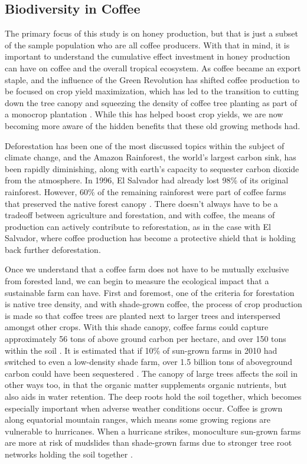 \documentclass[../main.tex]{subfiles}
\begin{document}
\subsection{Biodiversity in Coffee}

The primary focus of this study is on honey production, but that is just a subset of the sample population who are all coffee producers. With that in mind, it is important to understand the cumulative effect investment in honey production can have on coffee and the overall tropical ecosystem. As coffee became an export staple, and the influence of the Green Revolution has shifted coffee production to be focused on crop yield maximization, which has led to the transition to cutting down the tree canopy and squeezing the density of coffee tree planting as part of a monocrop plantation \parencite{hernandez-aguilera_economics_2019}. While this has helped boost crop yields, we are now becoming more aware of the hidden benefits that these old growing methods had.

Deforestation has been one of the most discussed topics within the subject of climate change, and the Amazon Rainforest, the world’s largest carbon sink, has been rapidly diminishing, along with earth’s capacity to sequester carbon dioxide from the atmosphere. In 1996, El Salvador had already lost 98\% of its original rainforest. However, 60\% of the remaining rainforest were part of coffee farms that preserved the native forest canopy \parencite{messer_can_2000}. There doesn’t always have to be a tradeoff between agriculture and forestation, and with coffee, the means of production can actively contribute to reforestation, as in the case with El Salvador, where coffee production has become a protective shield that is holding back further deforestation.

Once we understand that a coffee farm does not have to be mutually exclusive from forested land, we can begin to measure the ecological impact that a sustainable farm can have. First and foremost, one of the criteria for forestation is native tree density, and with shade-grown coffee, the process of crop production is made so that coffee trees are planted next to larger trees and interspersed amongst other crops. With this shade canopy, coffee farms could capture approximately 56 tons of above ground carbon per hectare, and over 150 tons within the soil \parencite{soto-pinto_carbon_2010}. It is estimated that if 10\% of sun-grown farms in 2010 had switched to even a low-density shade farm, over 1.5 billion tons of aboveground carbon could have been sequestered \parencite{soto-pinto_carbon_2010}. The canopy of large trees affects the soil in other ways too, in that the organic matter supplements organic nutrients, but also aids in water retention. The deep roots hold the soil together, which becomes especially important when adverse weather conditions occur. Coffee is grown along equatorial mountain ranges, which means some growing regions are vulnerable to hurricanes. When a hurricane strikes, monoculture sun-grown farms are more at risk of mudslides than shade-grown farms due to stronger tree root networks holding the soil together \parencite{philpott_biodiversity_2008}.
\end{document}
